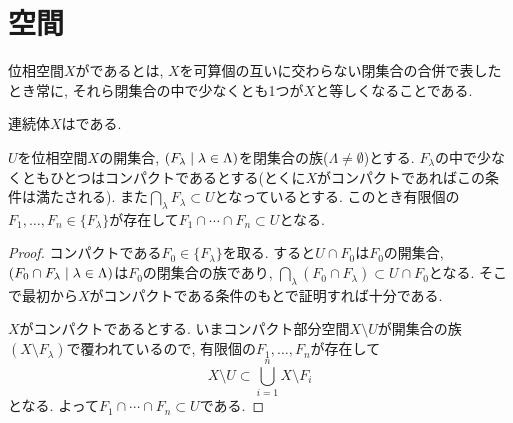 \documentclass[uplatex, dvipdfmx, a4paper, 12pt, class=jsbook, crop=false]{standalone}
\begin{document}
\section{\sigmaConnected 空間}
\label{sec:sigma-connected-spaces}

\newcommand{\loclabel}[1]{\label{LocalLabel-\thepart-\thechapter-\thesection:#1}}
\newcommand{\locref}[1]{\ref{LocalLabel-\thepart-\thechapter-\thesection:#1}}
\newcommand{\longrel}[1]{\ #1\ }

\begin{definition}
	位相空間$ X $がであるとは, $ X $を可算個の互いに交わらない閉集合の合併で表したとき常に, それら閉集合の中で少なくとも1つが$ X $と等しくなることである.
\end{definition}

\begin{theorem}
	\label{thm:Sierpinski_continuum}
	連続体$X$は\sigmaConnected である.
\end{theorem}

\begin{lemma}
	\loclabel{lemma:1}
	$ U $を位相空間$ X $の開集合, $ \setfamily{F_\lambda}{\lambda \in \Lambda} $を閉集合の族($ \Lambda \neq \emptyset $)とする. $ F_\lambda $の中で少なくともひとつはコンパクトであるとする(とくに$ X $がコンパクトであればこの条件は満たされる). また$ \bigcap_{\lambda} F_\lambda \subset U$となっているとする. このとき有限個の$ F_1, \ldots , F_n \in \{ F_\lambda\}$が存在して$ F_1 \cap \cdots \cap F_n \subset U $となる.
\end{lemma}
\begin{proof}
	コンパクトである$ F_0 \in \{F_\lambda\}$を取る. すると$ U \cap F_0 $は$ F_0 $の開集合, $ \setfamily{F_0 \cap F_\lambda}{\lambda \in \Lambda} $は$ F_0 $の閉集合の族であり, $ \bigcap_{\lambda} (F_0 \cap F_\lambda) \subset U \cap F_0 $となる. そこで最初から$ X $がコンパクトである条件のもとで証明すれば十分である.
	
	$ X $がコンパクトであるとする. いまコンパクト部分空間$ X \setminus U $が開集合の族$ (X \setminus F_\lambda) $で覆われているので, 有限個の$ F_1, \ldots, F_n $が存在して
	\[ X \setminus U \subset \bigcup_{i=1}^{n} X \setminus F_i \]
	となる. よって$ F_1 \cap \cdots \cap F_n \subset U $である.
\end{proof}
\end{document}
